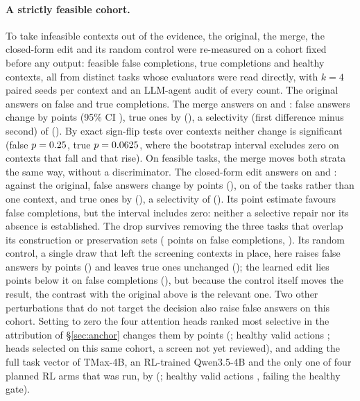 \paragraph{A strictly feasible cohort.} To take infeasible contexts out of the evidence, the original, the merge, the closed-form edit and its random control were re-measured on a cohort fixed before any output: \pwOrigTasks{} feasible false completions, \pwFsm{} true completions and \pwHealthy{} healthy contexts, all from distinct tasks whose evaluators were read directly, with $k=4$ paired seeds per context and an LLM-agent audit of every count. %
The original answers on \pwOrigFsp{} false and \pwOrigFsm{} true completions. The merge answers on \pwCuaFsp{} and \pwCuaFsm: false answers change by \pwCuaDeltaFsp{} points (95\% CI \pwCuaCiFsp), true ones by \pwCuaDeltaFsm{} (\pwCuaCiFsm), a selectivity (first difference minus second) of \pwCuaSel{} (\pwCuaSelCi). By exact sign-flip tests over contexts neither change is significant (false $p=0.25$, true $p=0.0625$, where the bootstrap interval excludes zero on \exCuaFsmWorse{} contexts that fall and \exCuaFsmBetter{} that rise). On feasible tasks, the merge moves both strata the same way, without a discriminator. The closed-form edit answers on \pwBroadFsp{} and \pwBroadFsm: against the original, false answers change by \pwBroadDeltaFsp{} points (\pwBroadCiFsp), on \pwBroadFspDown{} of the \pwOrigTasks{} tasks rather than one context, and true ones by \pwBroadDeltaFsm{} (\pwBroadCiFsm), a selectivity of \pwBroadSel{} (\pwBroadSelCi). Its point estimate favours false completions, but the interval includes zero: neither a selective repair nor its absence is established. The drop survives removing the three tasks that overlap its construction or preservation sets (\pwBroadSensDeltaFsp{} points on \pwSensFsp{} false completions, \pwBroadSensCiFsp). Its random control, a single draw that left the screening contexts in place, here raises false answers by \pwRandDeltaFsp{} points (\pwRandCiFsp) and leaves true ones unchanged (\pwRandDeltaFsm); the learned edit lies \pwBroadVsRandDeltaFsp{} points below it on false completions (\pwBroadVsRandCiFsp), but because the control itself moves the result, the contrast with the original above is the relevant one. Two other perturbations that do not target the decision also raise false answers on this cohort. Setting to zero the four attention heads ranked most selective in the attribution of \S\ref{sec:anchor} changes them by \mlZeroFsp{} points (\mlZeroFspCi; healthy valid actions \mlZeroHealthy; heads selected on this same cohort, a screen not yet reviewed), and adding the full task vector of TMax-4B, an RL-trained Qwen3.5-4B and the only one of four planned RL arms that was run, by \rlFsp{} (\rlFspCi; healthy valid actions \rlHealthy, failing the healthy gate). %

